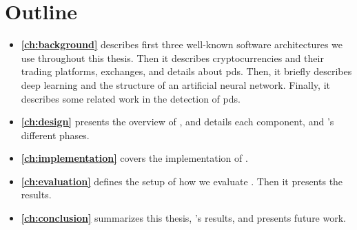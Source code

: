 \section{Outline}\label{sec:outline}
\begin{itemize}
    \item[] \textbf{\autoref{ch:background}} describes first three well-known software architectures we use throughout this thesis. Then it describes cryptocurrencies and their trading platforms, exchanges, and details about \acp{pd}. Then, it briefly describes deep learning and the structure of an artificial neural network. Finally, it describes some related work in the detection of \acp{pd}. 
    \item[] \textbf{\autoref{ch:design}} presents the overview of \project, and details each component, and \project's different phases. 
    \item[] \textbf{\autoref{ch:implementation}} covers the implementation of \project.
    \item[] \textbf{\autoref{ch:evaluation}} defines the setup of how we evaluate \project. Then it presents the results. 
    \item[] \textbf{\autoref{ch:conclusion}} summarizes this thesis, \project's results, and presents future work.
 \end{itemize}